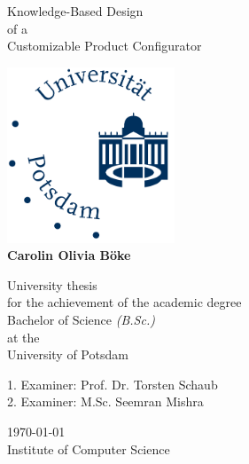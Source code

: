 
\begin{titlepage}
\begin{center}
    

	
\scshape %

	
	{\LARGE Knowledge-Based Design \\ of a \\ Customizable Product Configurator\\} %
	
\bigskip
 \vfil

\includegraphics[width = 5cm]{logo_UP.pdf} \\
\bigskip
        \vfil
        {\Large\textbf{Carolin Olivia Böke}}\\
        \vfil
        

        {\large 
University thesis 
\\[0.25 ex]
        for the achievement of the academic degree}\\[0.25 ex]
        \bigskip
        {\Large Bachelor of Science}
        {\large\emph{(B.Sc.)}}\\
        \bigskip
        {\large at the \\[0.25 ex]
        University of Potsdam}
        \vfil

  {\large 1. Examiner: Prof. Dr. Torsten Schaub}
\\
   { \large 2. Examiner: M.Sc. Seemran Mishra}\\
   
\bigskip
  \vfil

        {\large \today \\[0.25 ex]

        Institute of Computer Science \\[0.25 ex]
       }
\end{center}


\end{titlepage}
